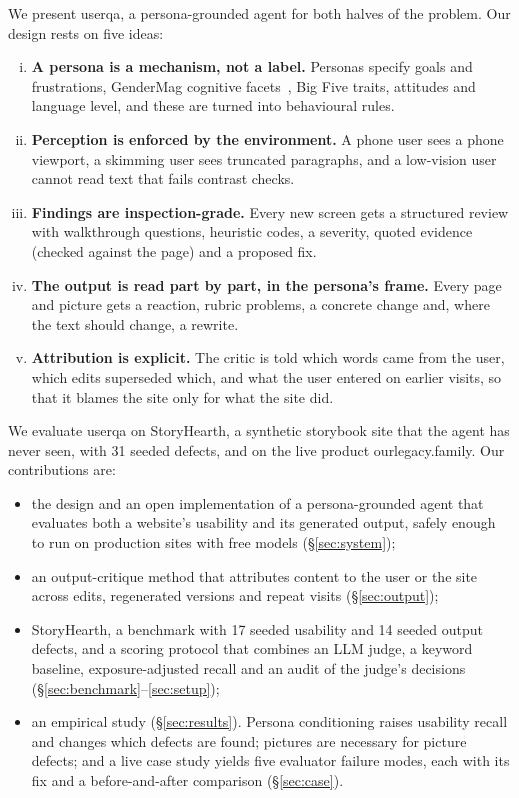 \documentclass[10pt,twocolumn]{article}
\newcommand{\sys}{\textsf{userqa}}
\newcommand{\site}{StoryHearth}
\newcommand{\ol}{\textsf{ourlegacy.family}}
\begin{document}
We present \sys{}, a persona-grounded agent for both halves of the problem. Our design rests on five ideas:
\begin{enumerate}[(i)]
\item \textbf{A persona is a mechanism, not a label.} Personas specify goals and frustrations, GenderMag cognitive facets~\cite{burnett2016gendermag}, Big Five traits, attitudes and language level, and these are turned into behavioural rules.
\item \textbf{Perception is enforced by the environment.} A phone user sees a phone viewport, a skimming user sees truncated paragraphs, and a low-vision user cannot read text that fails contrast checks.
\item \textbf{Findings are inspection-grade.} Every new screen gets a structured review with walkthrough questions, heuristic codes, a severity, quoted evidence (checked against the page) and a proposed fix.
\item \textbf{The output is read part by part, in the persona's frame.} Every page and picture gets a reaction, rubric problems, a concrete change and, where the text should change, a rewrite.
\item \textbf{Attribution is explicit.} The critic is told which words came from the user, which edits superseded which, and what the user entered on earlier visits, so that it blames the site only for what the site did.
\end{enumerate}

We evaluate \sys{} on \site{}, a synthetic storybook site that the agent has never seen, with 31 seeded defects, and on the live product \ol{}. Our contributions are:
\begin{itemize}
\item the design and an open implementation of a persona-grounded agent that evaluates both a website's usability and its generated output, safely enough to run on production sites with free models (\S\ref{sec:system});
\item an output-critique method that attributes content to the user or the site across edits, regenerated versions and repeat visits (\S\ref{sec:output});
\item \site{}, a benchmark with 17 seeded usability and 14 seeded output defects, and a scoring protocol that combines an LLM judge, a keyword baseline, exposure-adjusted recall and an audit of the judge's decisions (\S\ref{sec:benchmark}--\ref{sec:setup});
\item an empirical study (\S\ref{sec:results}). Persona conditioning raises usability recall and changes which defects are found; pictures are necessary for picture defects; and a live case study yields five evaluator failure modes, each with its fix and a before-and-after comparison (\S\ref{sec:case}).
\end{itemize}
\end{document}

